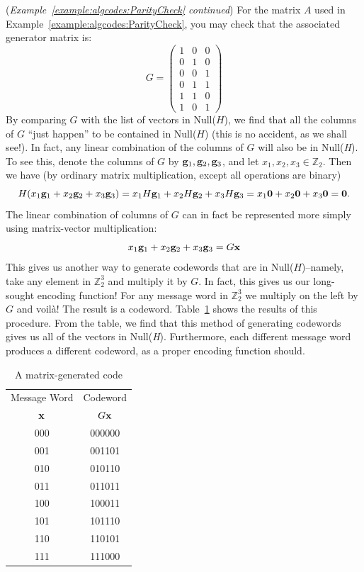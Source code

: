 \begin{example}{}
(\emph{Example~\ref{example:algcodes:ParityCheck} continued})
For the matrix $A$ used in Example~\ref{example:algcodes:ParityCheck}, you may check that the associated generator matrix is:
\[
G=
\left(
\begin{array}{ccc}
1 & 0 & 0 \\
0 & 1 & 0 \\
0 & 0 & 1 \\
0 & 1 & 1 \\
1 & 1 & 0 \\
1 & 0 & 1
\end{array}
\right)
\]
By comparing $G$ with the  list of vectors in Null($H$), we find that all the columns of $G$ ``just happen'' to be  contained in Null($H$) (this is no accident, as we shall see!). In fact, any linear combination of the columns of $G$ will also be in Null(\emph{H}). To see this, denote the columns of $G$ by ${\bold g}_1, {\bold g}_2, {\bold g}_3$, and let $x_1, x_2, x_3 \in \mathbb{Z}_2$. Then  we have (by ordinary matrix multiplication, except all operations are binary)
\[
H (x_1 {\bold g}_1 + x_2{\bold g}_2 + x_3{\bold g}_3) = 
x_1H {\bold g}_1 + x_2H{\bold g}_2 + x_3H{\bold g}_3
= x_1 {\bold 0} + x_2{\bold 0} + x_3{\bold 0} = {\bold 0}.
\]
 The linear combination of columns of $G$ can in fact be represented more simply using matrix-vector multiplication:
\[x_1 {\bold g}_1 + x_2{\bold g}_2 + x_3{\bold g}_3 = G{\bold x} 
\]
This gives us another way to generate codewords that are in Null($H$)--namely, take any element in $\mathbb{Z}_2^3$ and multiply it by $G$. In fact, this gives us our long-sought encoding function! For any message word in $\mathbb{Z}_2^3$ we multiply on the left by $G$ and voil\`{a}! The result is a codeword.
Table~\ref{table:algcodes:generator} shows the results of this procedure. From the table, we find that this method of generating codewords gives us all of the vectors in Null(\emph{H}). Furthermore, each different message word produces a different codeword, as a proper encoding function should.
 
\begin{table}[htb]
\caption{A matrix-generated code}\label{table:algcodes:generator}{\small
\begin{center}
\begin{tabular}{|c|c|}
\hline
Message Word  & Codeword \\
${\bold x}$ & $G {\bold x}$ \\ \hline
000 & 000000 \\
001 & 001101 \\
010 & 010110 \\
011 & 011011 \\
100 & 100011 \\
101 & 101110 \\
110 & 110101 \\
111 & 111000 \\
\hline
\end{tabular}
\end{center}
}
\end{table}
\end{example}

